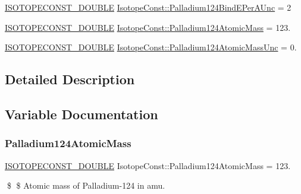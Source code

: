 \begin{DoxyCompactItemize}
\mbox{\hyperlink{group___isotope_const-_macros_ga8f45a7272ce02c0b4c65c44636ed719a}{I\+S\+O\+T\+O\+P\+E\+C\+O\+N\+S\+T\+\_\+\+D\+O\+U\+B\+LE}} \mbox{\hyperlink{group___isotope_const-_palladium-_pd124_gaea2d1a6183005a93955019d1cbb4c24d}{Isotope\+Const\+::\+Palladium124\+Bind\+E\+Per\+A\+Unc}} = 2
\item 
\mbox{\hyperlink{group___isotope_const-_macros_ga8f45a7272ce02c0b4c65c44636ed719a}{I\+S\+O\+T\+O\+P\+E\+C\+O\+N\+S\+T\+\_\+\+D\+O\+U\+B\+LE}} \mbox{\hyperlink{group___isotope_const-_palladium-_pd124_gadacaf7af223a8acaf127fe6485a635a2}{Isotope\+Const\+::\+Palladium124\+Atomic\+Mass}} = 123.
\item 
\mbox{\hyperlink{group___isotope_const-_macros_ga8f45a7272ce02c0b4c65c44636ed719a}{I\+S\+O\+T\+O\+P\+E\+C\+O\+N\+S\+T\+\_\+\+D\+O\+U\+B\+LE}} \mbox{\hyperlink{group___isotope_const-_palladium-_pd124_gad00233afd4ad40f4e771eb49dfc83341}{Isotope\+Const\+::\+Palladium124\+Atomic\+Mass\+Unc}} = 0.
\end{DoxyCompactItemize}


\subsection{Detailed Description}


\subsection{Variable Documentation}
\mbox{\label{group___isotope_const-_palladium-_pd124_gadacaf7af223a8acaf127fe6485a635a2}} 
\subsubsection{\texorpdfstring{Palladium124\+Atomic\+Mass}{Palladium124AtomicMass}}
{\footnotesize\ttfamily \mbox{\hyperlink{group___isotope_const-_macros_ga8f45a7272ce02c0b4c65c44636ed719a}{I\+S\+O\+T\+O\+P\+E\+C\+O\+N\+S\+T\+\_\+\+D\+O\+U\+B\+LE}} Isotope\+Const\+::\+Palladium124\+Atomic\+Mass = 123.}

\$ \$ Atomic mass of Palladium-\/124 in amu. \mbox{\label{group___isotope_const-_palladium-_pd124_gad00233afd4ad40f4e771eb49dfc83341}} 
